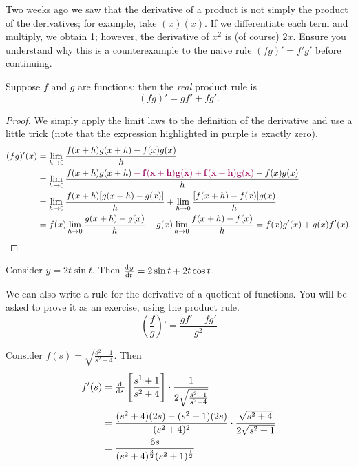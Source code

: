 


Two weeks ago we saw that the derivative of a product is not simply the product of the derivatives;
for example, take $ (x)(x) $. If we differentiate each term and multiply, we obtain 1; however,
the derivative of $ x^2 $ is (of course) $ 2x $. Ensure you understand why this is a counterexample
to the naive rule $ (fg)' = f'g' $ before continuing.

Suppose $ f $ and $ g $ are functions; then the \textit{real} product rule is
\begin{displaymath}
  (fg)' = gf' + fg'.
\end{displaymath}

\begin{proof}
  We simply apply the limit laws to the definition of the derivative and use a little trick (note that the expression highlighted
  in purple is exactly zero).
  \begin{align*}
    (fg)'(x) &= \lim_{h\to 0} \frac{f(x + h)g(x + h) - f(x) g(x)}{h}\\
             &= \lim_{h \to 0} \frac{f(x + h) g(x + h) \textcolor{RedViolet}{\mathbf{ {} - f(x + h)g(x) + f(x + h)g(x)}} - f(x)g(x)}{h}\\
             &= \lim_{h \to 0} \frac{f(x + h)[g(x + h) - g(x)]}{h} + \lim_{h\to 0} \frac{[f(x + h) - f(x)]g(x)}{h}\\
             &= f(x) \lim_{h \to 0} \frac{g(x + h) - g(x)}{h} + g(x) \lim_{h\to 0} \frac{f(x + h) - f(x)}{h} = f(x) g'(x) + g(x) f'(x).
  \end{align*}
\end{proof}

\begin{ex}
  Consider $ y = 2t \sin t $. Then $ \od{y}{t} = 2 \sin t + 2t \cos t $.
\end{ex}

We can also write a rule for the derivative of a quotient of functions. You will be asked to
prove it as an exercise, using the product rule.
\begin{displaymath}
  \left( \frac{f}{g} \right)' = \frac{gf' - fg'}{g^2}
\end{displaymath}

\begin{ex}
  Consider $ f(s) = \sqrt{\frac{s^2 + 1}{s^2 + 4}} $. Then
  \begin{align*}
    f'(s) &= \od{}{s} \left[ \frac{s^1 + 1}{s^2 + 4} \right] \cdot \frac{1}{2\sqrt{\frac{s^2 + 1}{s^2 + 4}}}\\
          &= \frac{(s^2 + 4)(2s) - (s^2 + 1)(2s)}{(s^2 + 4)^2} \cdot \frac{\sqrt{s^2 + 4}}{2\sqrt{s^2 + 1}}\\
          &= \frac{6s}{(s^2 + 4)^{\frac{3}{2}} (s^2 + 1)^{\frac{1}{2}}}
  \end{align*}
\end{ex}

